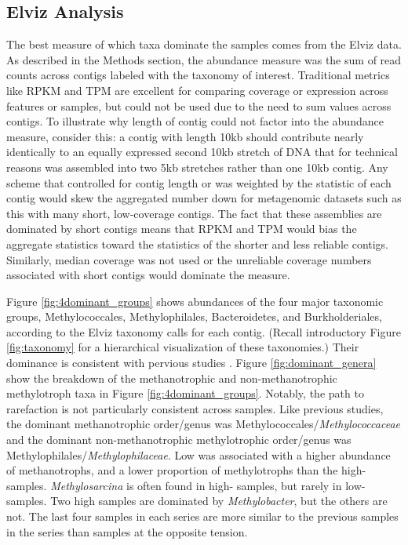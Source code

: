 \subsection{Elviz Analysis}

The best measure of which taxa dominate the samples comes from the Elviz \cite{cantor2015} data.
As described in the Methods section, the abundance measure was the sum of read counts across contigs labeled with the taxonomy of interest.
Traditional metrics like RPKM \cite{mortazavi2008} and TPM \cite{wagner2012} are excellent for comparing coverage or expression across features or samples, but could not be used due to the need to sum values across contigs.
To illustrate why length of contig could not factor into the abundance measure, consider this:
a contig with length 10kb should contribute nearly identically to an equally expressed second 10kb stretch of DNA that for technical reasons was assembled into two 5kb stretches rather than one 10kb contig.
Any scheme that controlled for contig length or was weighted by the statistic of each contig would skew the aggregated number down for metagenomic datasets such as this with many short, low-coverage contigs.
The fact that these assemblies are dominated by short contigs means that RPKM and TPM would bias the aggregate statistics toward the statistics of the shorter and less reliable contigs.
Similarly, median coverage was not used or the unreliable coverage numbers associated with short contigs would dominate the measure.

Figure \ref{fig:4dominant_groups} shows abundances of the four major taxonomic groups, Methylococcales, Methylophilales, Bacteroidetes, and Burkholderiales, according to the Elviz taxonomy calls for each contig. %
(Recall introductory Figure \ref{fig:taxonomy} for a hierarchical visualization of these taxonomies.)
Their dominance is consistent with pervious studies \cite{beck2013LW, beck2014LW, oshkin2015LW, hernandez2015LW, kalyuzhnaya2008Burkholderiales}.
Figure \ref{fig:dominant_genera} show the breakdown of the methanotrophic and non-methanotrophic methylotroph taxa in Figure \ref{fig:4dominant_groups}.
Notably, the path to rarefaction is not particularly consistent across samples.
Like previous studies, the dominant methanotrophic order/genus was Methylococcales/\textit{Methylococcaceae} and the dominant non-methanotrophic methylotrophic order/genus was Methylophilales/\textit{Methylophilaceae}.
Low  was associated with a higher abundance of methanotrophs, and a lower proportion of methylotrophs than the high- samples.
\textit{Methylosarcina} is often found in high- samples, but rarely in low- samples.
Two high  samples are dominated by \textit{Methylobacter}, but the others are not.
The last four samples in each series are more similar to the previous samples in the series than samples at the opposite  tension.


